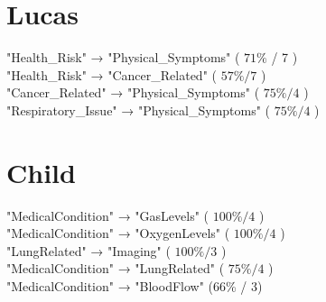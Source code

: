 \documentclass[10pt]{article}
\begin{document}
\section*{Lucas}
"Health\_Risk" → "Physical\_Symptoms" ( $71 \%$ / 7 )\\
"Health\_Risk" → "Cancer\_Related" ( $57 \% / 7$ )\\
"Cancer\_Related" → "Physical\_Symptoms" ( $75 \% / 4$ )\\
"Respiratory\_Issue" → "Physical\_Symptoms" ( $75 \% / 4$ )

\section*{Child}
"MedicalCondition" → "GasLevels" ( $100 \% / 4$ )\\
"MedicalCondition" → "OxygenLevels" ( $100 \% / 4$ )\\
"LungRelated" → "Imaging" ( $100 \% / 3$ )\\
"MedicalCondition" → "LungRelated" ( $75 \% / 4$ )\\
"MedicalCondition" → "BloodFlow" (66\% / 3)
\end{document}
